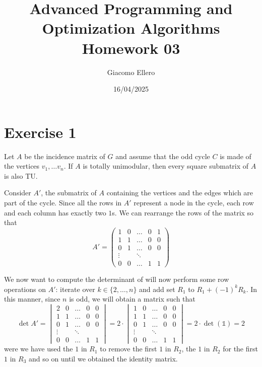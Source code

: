 \documentclass[12pt]{extarticle}
\title{Advanced Programming and Optimization Algorithms \\ Homework 03}
\author{Giacomo Ellero}
\date{16/04/2025}
\numberwithin{equation}{section}
\begin{document}
\maketitle

\section*{Exercise 1}

Let $A$ be the incidence matrix of $G$ and assume that the odd cycle $C$ is made of the vertices
$v_1, \dots v_n$.
If $A$ is totally unimodular, then every square submatrix of $A$ is also TU.

Consider $A'$, the submatrix of $A$ containing the vertices and the edges which are part of the
cycle.
Since all the rows in $A'$ represent a node in the cycle, each row and each column has exactly two
$1$s.
We can rearrange the rows of the matrix so that
\begin{equation}
	A' = \begin{pmatrix}
		1      & 0 & \dots  & 0 & 1 \\
		1      & 1 & \dots  & 0 & 0 \\
		0      & 1 & \dots  & 0 & 0 \\
		\vdots &   & \ddots &   &   \\
		0      & 0 & \dots  & 1 & 1
	\end{pmatrix}
\end{equation}

We now want to compute the determinant of will now perform some row operations on $A'$: iterate over
$k \in \{2, \dots, n\}$ and add set $R_1$ to $R_1 + (-1)^k R_k$. In this manner, since $n$ is odd,
we will obtain a matrix such that
\begin{equation}
	\det A' =
	\begin{vmatrix}
		2      & 0 & \dots  & 0 & 0 \\
		1      & 1 & \dots  & 0 & 0 \\
		0      & 1 & \dots  & 0 & 0 \\
		\vdots &   & \ddots &   &   \\
		0      & 0 & \dots  & 1 & 1
	\end{vmatrix} =
	2 \cdot
	\begin{vmatrix}
		1      & 0 & \dots  & 0 & 0 \\
		1      & 1 & \dots  & 0 & 0 \\
		0      & 1 & \dots  & 0 & 0 \\
		\vdots &   & \ddots &   &   \\
		0      & 0 & \dots  & 1 & 1
	\end{vmatrix} = 2 \cdot \det(\mathds{1} ) = 2
\end{equation}
were we have used the $1$ in $R_1$ to remove the first $1$ in $R_2$, the $1$ in $R_2$ for the first
$1$ in $R_3$ and so on until we obtained the identity matrix.
\end{document}

